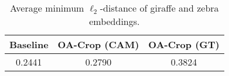 \begin{table}[h]
\centering\small
\caption{
Average minimum $\ell_2$-distance of giraffe and zebra embeddings.
}\label{tab:multi-bias}
\begin{tabular}{ccc}
\toprule
Baseline & OA-Crop (CAM) & OA-Crop (GT) \\
\midrule
0.2441 & 0.2790 & 0.3824 \\
\bottomrule
\end{tabular}
\end{table}
